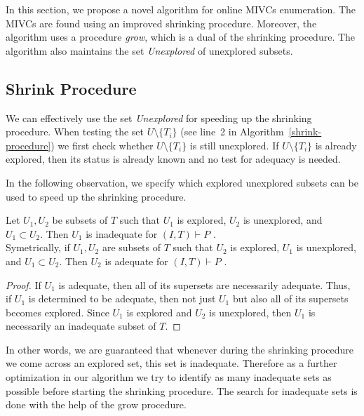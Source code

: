 In this section, we propose a novel algorithm for online MIVCs enumeration. The MIVCs are found using an improved shrinking procedure. Moreover, the algorithm uses a procedure \emph{grow}, which is a dual of the shrinking procedure. The algorithm also maintains the set \emph{Unexplored} of unexplored subsets. 
\subsection{Shrink Procedure}\label{sec:shrink}

We can effectively use the set  \textit{Unexplored} for speeding up the shrinking procedure. When testing the set $U \setminus \{T_i\}$ (see line~2 in Algorithm~\ref{shrink-procedure}) we first check whether  $U \setminus \{T_i\}$ is still unexplored. If $U \setminus \{T_i\}$ is already explored, then its status is already known and no test for adequacy is needed.

In the following observation, we specify which explored unexplored subsets can be used to speed up the shrinking procedure.


\begin{observation}
\label{observation:explored-property}
Let $U_1, U_2$ be subsets of $T$ such that $U_1$ is explored, $U_2$ is unexplored, and $U_1 \subset U_2$. Then $U_1$ is inadequate  for $(I, T) \vdash P$ .\\
Symetrically, if $U_1, U_2$ are subsets of $T$ such that $U_2$ is explored, $U_1$ is unexplored, and $U_1 \subset U_2$. Then $U_2$ is adequate  for $(I, T) \vdash P$ .
\end{observation}

\begin{proof}
If $U_1$ is adequate, then all of its supersets are necessarily adequate. Thus, if $U_1$ is determined to be adequate, then not just $U_1$ but also all of its supersets becomes explored. Since $U_1$ is explored and $U_2$ is unexplored, then $U_1$ is necessarily an inadequate subset of $T$.
\end{proof}

In other words, we are guaranteed that whenever during the shrinking procedure we come across an explored set, this set is inadequate. 
Therefore as a further optimization in our algorithm we try to identify as many inadequate sets as possible before starting the shrinking procedure. 
The search for inadequate sets is done with the help  of the grow procedure.






